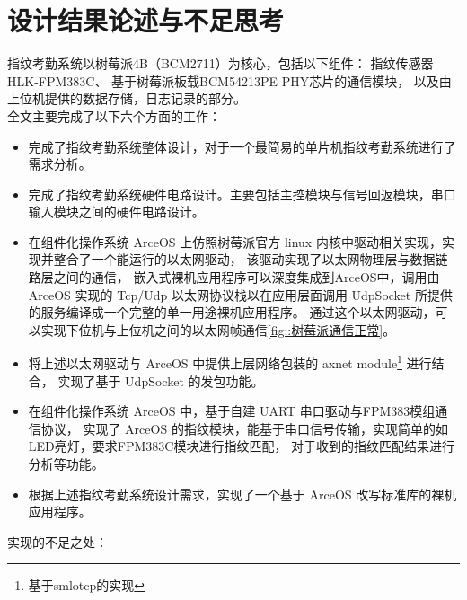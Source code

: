 \section{设计结果论述与不足思考}

    指纹考勤系统以树莓派4B（BCM2711）为核心，包括以下组件：
    指纹传感器HLK-FPM383C、
    基于树莓派板载BCM54213PE PHY芯片的通信模块，
    以及由上位机提供的数据存储，日志记录的部分。\\

    \noindent 全文主要完成了以下六个方面的工作：

    \begin{itemize}
        \item 完成了指纹考勤系统整体设计，对于一个最简易的单片机指纹考勤系统进行了需求分析。
        \item 完成了指纹考勤系统硬件电路设计。主要包括主控模块与信号回返模块，串口输入模块之间的硬件电路设计。
        \item 在组件化操作系统 ArceOS 上仿照树莓派官方 linux 内核中驱动相关实现，实现并整合了一个能运行的以太网驱动，
            该驱动实现了以太网物理层与数据链路层之间的通信，
            嵌入式裸机应用程序可以深度集成到ArceOS中，调用由 ArceOS 实现的 Tcp/Udp 以太网协议栈以在应用层面调用 UdpSocket 所提供的服务编译成一个完整的单一用途裸机应用程序。
            通过这个以太网驱动，可以实现下位机与上位机之间的以太网帧通信\ref{fig::树莓派通信正常}。
        \item 将上述以太网驱动与 ArceOS 中提供上层网络包装的 axnet module\footnote{基于smlotcp的实现} 进行结合，
            实现了基于 UdpSocket 的发包功能。
        \item 在组件化操作系统 ArceOS 中，基于自建 UART 串口驱动与FPM383模组通信协议\cite{noauthor_fpm383c_nodate}，
            实现了 ArceOS 的指纹模块，能基于串口信号传输，实现简单的如LED亮灯，要求FPM383C模块进行指纹匹配，
            对于收到的指纹匹配结果进行分析等功能。
        \item 根据上述指纹考勤系统设计需求，实现了一个基于 ArceOS 改写标准库的裸机应用程序。
    \end{itemize}

    \noindent 实现的不足之处：

